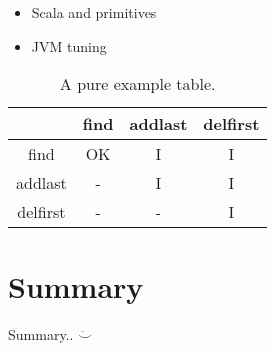 \documentclass[a4paper,english]{report}
\begin{document}
\begin{itemize}
  \item Scala and primitives
  \item JVM tuning
\end{itemize}

\begin{table}[ht]
  \centering
  \begin{tabular}{c c c c}
    \hline\hline
    & find & addlast & delfirst \\ [0.5ex]
    \hline\hline
    find & OK & I & I \\
    addlast & - & I & I \\
    delfirst & - & - & I \\
    \hline\hline
  \end{tabular}
  \caption{A pure example table.\label{tab:ex1}}
\end{table}

\chapter{Summary}

Summary.. $\ddot\smile$



\end{document}
